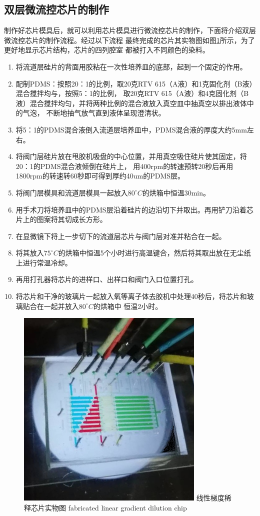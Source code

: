 \subsection{双层微流控芯片的制作}
	制作好芯片模具后，就可以利用芯片模具进行微流控芯片的制作，下面将介绍双层微流控芯片的制作流程。经过以下流程
	最终完成的芯片其实物图如图\ref{fig:chap2:chip-fabric}所示，为了更好地显示芯片结构，芯片的四列腔室
	都被打入不同颜色的染料。
	\begin{enumerate}[label={(\arabic*)},font={\color{black!50!black}\bfseries}]
	\item 将流道层硅片的背面用胶粘在一次性培养皿的底部，起到一个固定的作用。
	\item 配制PDMS：按照20：1的比例，取20克RTV 615（A液）和1克固化剂（B液）混合搅拌均与，按照5：1的比例，
	取20克RTV 615（A液）和4克固化剂（B液）混合搅拌均匀，并将两种比例的混合液放入真空皿中抽真空以排出液体中的气泡，
	不断地抽气放气直到液体呈现澄清状。
	\item 将5：1的PDMS混合液倒入流道层培养皿中，PDMS混合液的厚度大约5mm左右。
	\item 将阀门层硅片放在甩胶机吸盘的中心位置，并用真空吸住硅片使其固定，将20：1的PDMS混合液倾倒在硅片上，
	用400rpm的转速预转20秒后再用1800rpm的转速转60秒即可得到厚约40um的PDMS层。
	\item 将阀门层模具和流道层模具一起放入$80^\circ C$的烘箱中恒温30min。
	\item 用手术刀将培养皿中的PDMS层沿着硅片的边沿切下并取出。再用铲刀沿着芯片上的图案将其切成长方形。
	\item 在显微镜下将上一步切下的流道层芯片与阀门层对准并粘合在一起。
	\item 将其放入$75^\circ C$的烘箱中恒温5个小时进行高温键合，然后将其取出放在无尘纸上进行常温冷却。
	\item 再用打孔器将芯片的进样口、出样口和阀门入口位置打孔。
	\item 将芯片和干净的玻璃片一起放入氧等离子体去胶机中处理40秒后，将芯片和玻璃贴合在一起并放入$80^\circ C$的烘箱中
	恒温2小时。
	\end{enumerate}
	\begin{figure}[htbp]
	  \centering
	  \includegraphics[width=9cm]{figure/chap2/fabric-chip.jpg}
	  \bicaption
		{线性梯度稀释芯片实物图}
		{fabricated linear gradient dilution chip}
	  \label{fig:chap2:chip-fabric}
	\end{figure}
